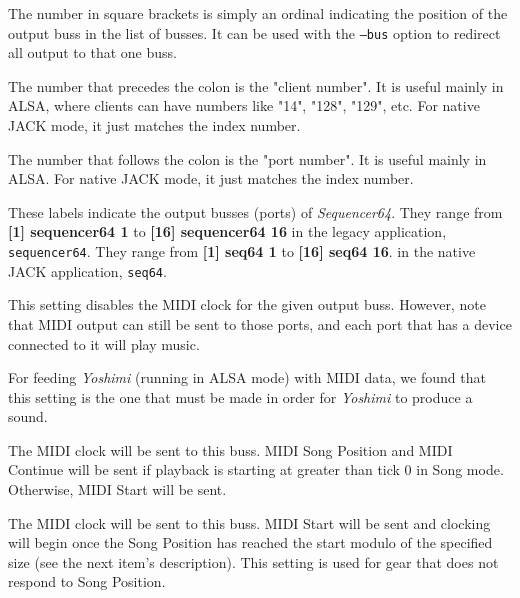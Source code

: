    \setcounter{ItemCounter}{0}      %

   The number in square brackets is simply an ordinal indicating the position
   of the output buss in the list of busses.
   It can be used with the \texttt{--bus} option to redirect all output to that
   one buss.

   The number that precedes the colon is the "client number".
   It is useful mainly in ALSA, where clients can have numbers like "14",
   "128", "129", etc.  For native JACK mode, it just matches the index number.

   The number that follows the colon is the "port number".
   It is useful mainly in ALSA.
   For native JACK mode, it just matches the index number.

   These labels indicate the output busses (ports) of \textsl{Sequencer64}.
   They range from \textbf{[1] sequencer64 1} to \textbf{[16] sequencer64 16}
   in the legacy application, \texttt{sequencer64}.
   They range from \textbf{[1] seq64 1} to \textbf{[16] seq64 16}.
   in the native JACK application, \texttt{seq64}.

   This setting disables the MIDI clock for the given output buss.
   However, note that MIDI output can still be sent to those ports, and
   each port that has a device connected to it will play music.

   For feeding \textsl{Yoshimi} (running in ALSA mode)
   with MIDI data, we found that this
   setting is the one that must be made in order for \textsl{Yoshimi} to
   produce a sound.

   The MIDI clock will be sent to this buss.
   MIDI Song Position and MIDI Continue will be sent if playback is starting
   at greater than tick 0 in Song mode.  Otherwise, MIDI Start will be sent.

   The MIDI clock will be sent to this buss.
   MIDI Start will be sent and clocking will begin
   once the Song Position has reached the start modulo of the specified size
   (see the next item's description).
   This setting is used for gear that does not respond to Song Position.


